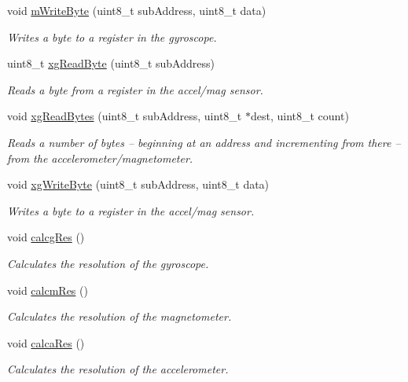 \begin{DoxyCompactItemize}
void \hyperlink{classLSM9DS1_afc171c924102c97fa1d88fa7f48bd167}{m\+Write\+Byte} (uint8\+\_\+t sub\+Address, uint8\+\_\+t data)
\begin{DoxyCompactList}\small\item\em Writes a byte to a register in the gyroscope. \end{DoxyCompactList}\item 
uint8\+\_\+t \hyperlink{classLSM9DS1_af7f9789df6f0178764c815a3380c202a}{xg\+Read\+Byte} (uint8\+\_\+t sub\+Address)
\begin{DoxyCompactList}\small\item\em Reads a byte from a register in the accel/mag sensor. \end{DoxyCompactList}\item 
void \hyperlink{classLSM9DS1_ae0a9cbfd74b1f4676f091c2d8e491d77}{xg\+Read\+Bytes} (uint8\+\_\+t sub\+Address, uint8\+\_\+t $\ast$dest, uint8\+\_\+t count)
\begin{DoxyCompactList}\small\item\em Reads a number of bytes -- beginning at an address and incrementing from there -- from the accelerometer/magnetometer. \end{DoxyCompactList}\item 
void \hyperlink{classLSM9DS1_a263eed4b52ad087a1195755c6ba49e62}{xg\+Write\+Byte} (uint8\+\_\+t sub\+Address, uint8\+\_\+t data)
\begin{DoxyCompactList}\small\item\em Writes a byte to a register in the accel/mag sensor. \end{DoxyCompactList}\item 
void \hyperlink{classLSM9DS1_a303e0dd33e000579dc3917aecedb6e63}{calcg\+Res} ()
\begin{DoxyCompactList}\small\item\em Calculates the resolution of the gyroscope. \end{DoxyCompactList}\item 
void \hyperlink{classLSM9DS1_a830dfc95c7e2d8524720d78357b053cb}{calcm\+Res} ()
\begin{DoxyCompactList}\small\item\em Calculates the resolution of the magnetometer. \end{DoxyCompactList}\item 
void \hyperlink{classLSM9DS1_a31597c9ae6c5a7de64a50cbbbcd24297}{calca\+Res} ()
\begin{DoxyCompactList}\small\item\em Calculates the resolution of the accelerometer. \end{DoxyCompactList}\item 

\end{DoxyCompactItemize}
